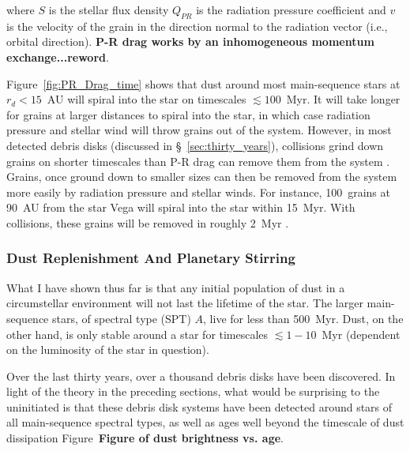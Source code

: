     \noindent where $S$ is the stellar flux density $Q_{PR}$ is the radiation pressure coefficient and $v$ is the velocity of the grain in the direction normal to the radiation vector (i.e., orbital direction)\citep{Burns1979}. \textbf{P-R drag works by an inhomogeneous momentum exchange...reword}.
    
    Figure~\ref{fig:PR_Drag_time} shows that dust around most main-sequence stars at $r_d<15$~AU will spiral into the star on timescales $\lesssim 100$~Myr. It will take longer for grains at larger distances to spiral into the star, in which case radiation pressure and stellar wind will throw grains out of the system. However, in most detected debris disks (discussed in \S~\ref{sec:thirty_years}), collisions grind down grains on shorter timescales than P-R drag can remove them from the system \citep[e.g.,][]{Wyatt2008}. Grains, once ground down to smaller sizes can then be removed from the system more easily by radiation pressure and stellar winds. For instance, 100\micron\  grains at 90~AU from the star Vega will spiral into the star within 15~Myr. With collisions, these grains will be removed in roughly 2~Myr \citep{Backman1993}. 
    
    \subsubsection{Dust Replenishment And Planetary Stirring}\label{sec:replenishment}
    
    What I have shown thus far is that any initial population of dust in a circumstellar environment will not last the lifetime of the star. The larger main-sequence stars, of spectral type (SPT) $A$, live for less than 500~Myr. Dust, on the other hand, is only stable around a star for timescales $\lesssim 1-10$~Myr (dependent on the luminosity of the star in question). 
    
    Over the last thirty years, over a thousand debris disks have been discovered. In light of the theory in the preceding sections, what would be surprising to the uninitiated is that these debris disk systems have been detected around stars of all main-sequence spectral types, as well as ages well beyond the timescale of dust dissipation Figure~\textbf{Figure of dust brightness vs. age}. 
    
    
